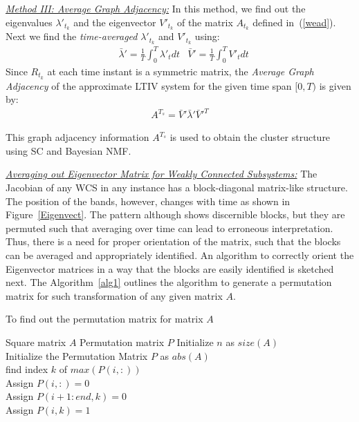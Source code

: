 \underline{\textit{Method III: Average Graph Adjacency:}} In this method, we find out the eigenvalues $\lambda'_{t_k}$ and the eigenvector $V'_{t_k}$ of the matrix $A_{t_k}$ defined in~(\ref{wead}). Next we find the \textit{time-averaged} $\lambda'_{t_k}$ and $V'_{t_k}$ using:
\begin{align}
&\bar{\lambda}' = \frac{1}{T} \int_{0}^{T} \lambda'_t dt 
&\bar{V}' = \frac{1}{T} \int_{0}^{T} V'_t dt  
\end{align}
Since $R_{t_k}$ at each time instant is a symmetric matrix, the \textit{Average Graph Adjacency} of the approximate LTIV system for the given time span $[0,T)$ is given by:
\begin{align}
A^{T_s} = \bar{V}'\bar{\lambda}'\bar{V}'^T
\end{align}

This graph adjacency information $A^{T_s}$ is used to obtain the cluster structure using SC and Bayesian NMF.

\underline{\textit{Averaging out Eigenvector Matrix for Weakly Connected Subsystems:}}
The Jacobian of any WCS in any instance has a block-diagonal matrix-like structure. The position of the bands, however, changes with time as shown in Figure~\ref{Eigenvect}. The pattern although shows discernible blocks, but they are permuted such that averaging over time can lead to erroneous interpretation. Thus, there is a need for proper orientation of the matrix, such that the blocks can be averaged and appropriately identified. An algorithm to correctly orient the Eigenvector matrices in a way that the blocks are easily identified is sketched next. The Algorithm~\ref{alg1} outlines the algorithm to generate a permutation matrix for such transformation of any given matrix $A$.

\begin{algorithm}[H]
\caption{To find out the permutation matrix for matrix $A$}
\label{alg1}
\begin{algorithmic}
\Require Square matrix $A$ 
\Ensure Permutation matrix $P$
\do Initialize $n$ as $size(A)$ \\
\do Initialize the Permutation Matrix $P$ as $abs(A)$ 
 \\
\do find index $k$ of $max(P(i,:))$ \\
Assign $P(i,:) = 0$ \\
Assign $P(i+1:end,k) = 0$ \\
Assign $P(i,k) = 1$ 
\EndFor 
\end{algorithmic}
\end{algorithm}

